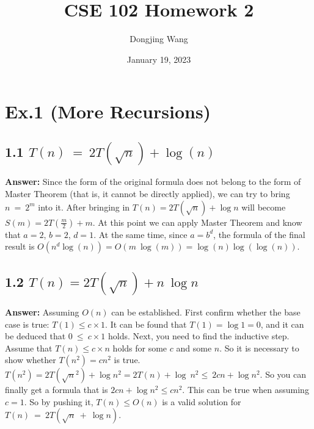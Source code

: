 \documentclass{article}
\title{CSE 102 Homework 2}
\author{Dongjing Wang}
\affil{Student ID: 1823945}
\date{January 19, 2023}
\begin{document}
\maketitle

\section*{Ex.1 (More Recursions)}
    \subsection*{1.1 $T\left(n\right)\:=\:2T\left(\sqrt{n}\right)+\log\left(n\right)$}
    \textbf{Answer:} Since the form of the original formula does not belong to the form of Master Theorem (that is, it cannot be directly applied), we can try to bring $n\:=\:2^m$ into it. After bringing in $T\left(n\right)=2T\left(\sqrt{n}\right)+\log n$ will become $S\left(m\right)=2T\left(\frac {m}{2}\right)+m$. At this point we can apply Master Theorem and know that $a=2$, $b=2$, $d=1$. At the same time, since $a=b^d$, the formula of the final result is $O\left(n^d\log \left(n\right)\right)=O\left(m\:\log \left(m \right)\right)=\log \left(n\right)\log \left(\log \left(n\right)\right)$.
    \subsection*{1.2 $T\left(n\right)=2T\left(\sqrt{n}\right)+n\:\log n$}
    \textbf{Answer:} Assuming $O\left(n\right)$ can be established. First confirm whether the base case is true: $T\left(1\right)\le c\times 1$. It can be found that $T\left(1\right)=\log 1=0$, and it can be deduced that $0\:\le \:c\times 1$ holds. Next, you need to find the inductive step. Assume that $T\left(n\right)\le c\times n$ holds for some $c$ and some $n$. So it is necessary to show whether $T\left(n^2\right)=cn^2$ is true. $T\left(n^2\right)=2T\left(\sqrt{n}^2\right)+\log n^2=2T\left(n\right)+\log \:n^2\le \:2cn+\log n^2$. So you can finally get a formula that is $2cn+\log n^2\le cn^2$. This can be true when assuming $c=1$. So by pushing it, $T\left(n\right)\le O\left(n\right)$ is a valid solution for $T\left(n\right)\:=\:2T\left(\sqrt{n}\:+\:\log n\right)$.
\end{document}

